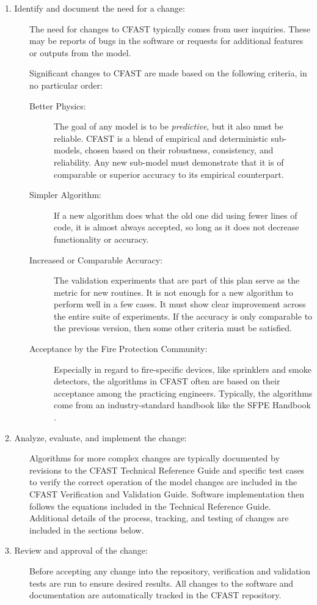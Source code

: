 \documentclass[12pt]{book}
\begin{document}
\begin{description}
    \item [1. Identify and document the need for a change:] The need for changes to CFAST typically comes from user inquiries. These may be reports of bugs in the software or requests for additional features or outputs from the model.
    
    Significant changes to CFAST are made based on the following criteria, in no particular order:
    \begin{description}
        \item[Better Physics:] The goal of any model is to be {\em predictive}, but it also must be reliable. CFAST is a blend of empirical and deterministic sub-models, chosen based on their robustness, consistency, and reliability. Any new sub-model must demonstrate that it is of comparable or superior accuracy to its empirical counterpart.
        \item[Simpler Algorithm:] If a new algorithm does what the old one did using fewer lines of code, it is almost always accepted, so long as it does not decrease functionality or accuracy.
        \item[Increased or Comparable Accuracy:] The validation experiments that are part of this plan serve as the metric for new routines. It is not enough for a new algorithm to perform well in a few cases. It must show clear improvement across the entire suite of experiments. If the accuracy is only comparable to the previous version, then some other criteria must be satisfied.
        \item[Acceptance by the Fire Protection Community:] Especially in regard to fire-specific devices, like sprinklers and smoke detectors, the algorithms in CFAST often are based on their acceptance among the practicing engineers. Typically, the algorithms come from an industry-standard handbook like the SFPE Handbook \cite{SFPE:2003}.
    \end{description}
    \item [2. Analyze, evaluate, and implement the change:] Algorithms for more complex changes are typically documented by revisions to the CFAST Technical Reference Guide and specific test cases to verify the correct operation of the model changes are included in the CFAST Verification and Validation Guide. Software implementation then follows the equations included in the Technical Reference Guide. Additional details of the process, tracking, and testing of changes are included in the sections below.
    \item [3. Review and approval of the change:] Before accepting any change into the repository, verification and validation tests are run to ensure desired results. All changes to the software and documentation are automatically tracked in the CFAST repository.

\end{description}
\end{document}

